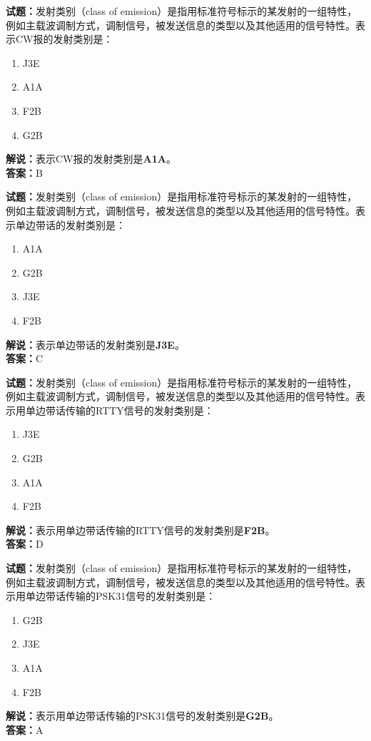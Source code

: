 \documentclass{ctexbook}
\begin{document}
\vspace{\baselineskip}

\noindent\textbf{试题：}发射类别（class of emission）是指用标准符号标示的某发射的一组特性，例如主载波调制方式，调制信号，被发送信息的类型以及其他适用的信号特性。表示CW报的发射类别是：
\begin{enumerate}[leftmargin=3em]
  \item J3E
  \item A1A
  \item F2B
  \item G2B
\end{enumerate}
\noindent\textbf{解说：}表示CW报的发射类别是\textbf{A1A}。\\\noindent\textbf{答案：}B

\vspace{\baselineskip}

\noindent\textbf{试题：}发射类别（class of emission）是指用标准符号标示的某发射的一组特性，例如主载波调制方式，调制信号，被发送信息的类型以及其他适用的信号特性。表示单边带话的发射类别是：
\begin{enumerate}[leftmargin=3em]
  \item A1A
  \item G2B
  \item J3E
  \item F2B
\end{enumerate}
\noindent\textbf{解说：}表示单边带话的发射类别是\textbf{J3E}。\\\noindent\textbf{答案：}C

\vspace{\baselineskip}

\noindent\textbf{试题：}发射类别（class of emission）是指用标准符号标示的某发射的一组特性，例如主载波调制方式，调制信号，被发送信息的类型以及其他适用的信号特性。表示用单边带话传输的RTTY信号的发射类别是：
\begin{enumerate}[leftmargin=3em]
  \item J3E
  \item G2B
  \item A1A
  \item F2B
\end{enumerate}
\noindent\textbf{解说：}表示用单边带话传输的RTTY信号的发射类别是\textbf{F2B}。\\\noindent\textbf{答案：}D

\vspace{\baselineskip}

\noindent\textbf{试题：}发射类别（class of emission）是指用标准符号标示的某发射的一组特性，例如主载波调制方式，调制信号，被发送信息的类型以及其他适用的信号特性。表示用单边带话传输的PSK31信号的发射类别是：
\begin{enumerate}[leftmargin=3em]
  \item G2B
  \item J3E
  \item A1A
  \item F2B
\end{enumerate}
\noindent\textbf{解说：}表示用单边带话传输的PSK31信号的发射类别是\textbf{G2B}。\\\noindent\textbf{答案：}A
\end{document}
